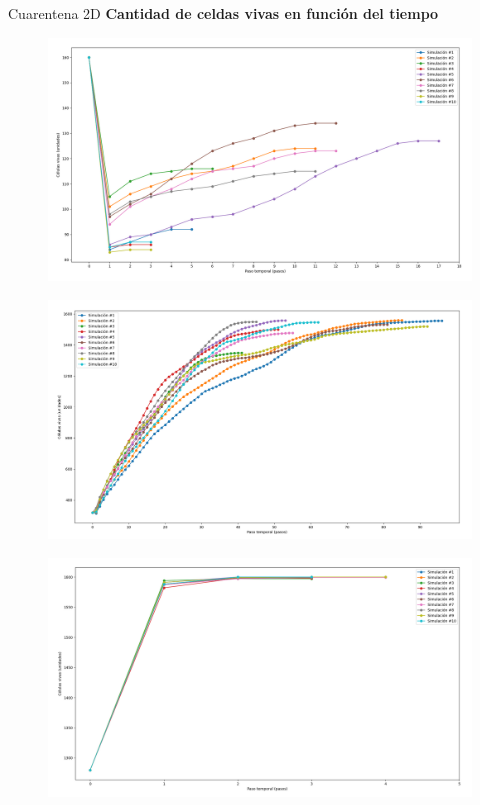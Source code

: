 \begin{frame}{Cuarentena 2D}
    \textcolor{hkustblue}\textbf{Cantidad de celdas vivas en función del tiempo}
    {\small
    \begin{multicols}{3}
        {
            \begin{figure}[H]
                \centering
                \includegraphics[width=0.8\linewidth]{pic/cuarentena2d/size_i10}
                \label{fig:cuarentena:size:i10}
            \end{figure}
        }

        {
            \begin{figure}[H]
                \centering
                \includegraphics[width=0.8\linewidth]{pic/cuarentena2d/size_i20}
                \label{fig:cuarentena:size:i20}
            \end{figure}
        }

        {
            \begin{figure}[H]
                \centering
                \includegraphics[width=0.8\linewidth]{pic/cuarentena2d/size_i80}
                \label{fig:cuarentena:size:i80}
            \end{figure}
        }
    \end{multicols}
    }
\end{frame}


